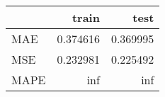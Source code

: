 \begin{tabular}{lrr}
\toprule
{} &     train &      test \\
\midrule
MAE  &  0.374616 &  0.369995 \\
MSE  &  0.232981 &  0.225492 \\
MAPE &       inf &       inf \\
\bottomrule
\end{tabular}
